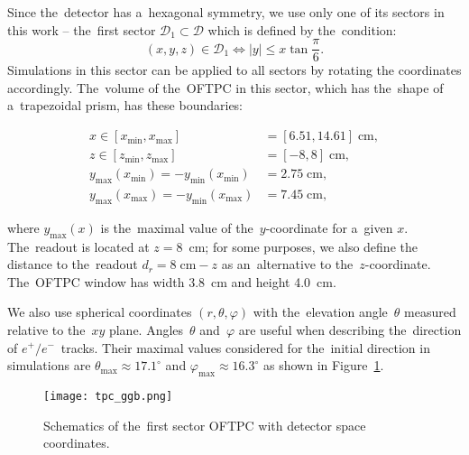 				Since the~detector has a~hexagonal symmetry, we use only one of its sectors in this work -- the~first sector $\mathcal{D}_1 \subset \mathcal{D}$ which is defined by the~condition:
					\begin{equation}
						(x,y,z) \in \mathcal{D}_1 \Leftrightarrow |y| \leq x\tan \frac{\pi}{6}.
					\end{equation}
				Simulations in this sector can be applied to all sectors by rotating the coordinates accordingly. The~volume of the~\ac{OFTPC} in this sector, which has the~shape of a~trapezoidal prism, has these boundaries:
					\begin{linenomath}
						\begin{align}
							x \in [x_\text{min},x_\text{max}] &= [6.51, 14.61] \;\text{cm},\\
							z \in [z_\text{min},z_\text{max}] &= [-8,8] \;\text{cm},\\
							y_\text{max}(x_\text{min}) = -y_\text{min}(x_\text{min}) &=  2.75\;\text{cm},\\
							y_\text{max}(x_\text{max}) = -y_\text{min}(x_\text{max}) &=  7.45\;\text{cm},
						\end{align}
					\end{linenomath}
				where $y_\text{max}(x)$ is the~maximal value of the~$y$-coordinate for a~given $x$. The~readout is located at $z = 8$~cm; for some purposes, we also define the distance to the~readout $d_r = 8\;\text{cm}-z$ as an~alternative to the~$z$-coordinate. The~\ac{OFTPC} window has width 3.8~cm and height 4.0~cm.
				
				We also use spherical coordinates $(r,\theta,\varphi)$ with the~elevation angle~$\theta$ measured relative to the~$xy$ plane. Angles~$\theta$ and~$\varphi$ are useful when describing the~direction of $e^+/e^-$~tracks. Their maximal values considered for the~initial direction in simulations are $\theta_\text{max} \approx 17.1^\circ$ and $\varphi_\text{max} \approx 16.3^\circ$ as shown in Figure~\ref{fig:oftpc}.
				
				\begin{figure}
					\centering
					\texttt{[image: tpc\_ggb.png]}
					\caption{Schematics of the~first sector \ac{OFTPC} with detector space coordinates.}
					\label{fig:oftpc}
				\end{figure}
			
